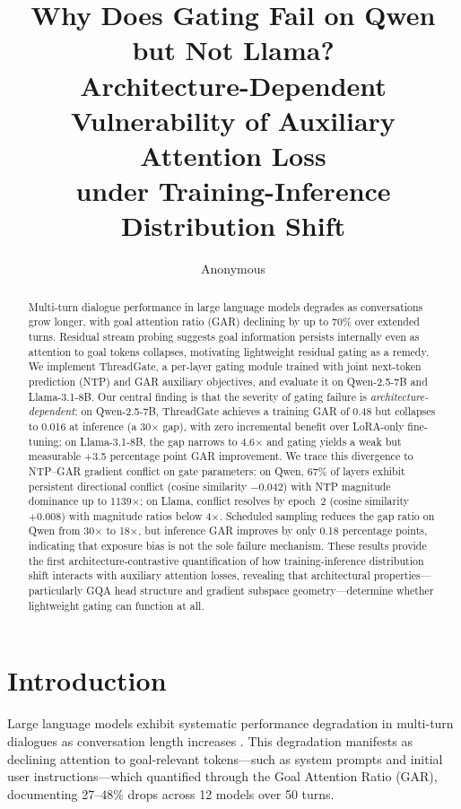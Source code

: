 \documentclass[11pt,a4paper]{article}
\title{Why Does Gating Fail on Qwen but Not Llama?\\Architecture-Dependent Vulnerability of Auxiliary Attention Loss\\under Training-Inference Distribution Shift}
\author{Anonymous}
\date{}
\begin{document}
\maketitle

\begin{abstract}
Multi-turn dialogue performance in large language models degrades as conversations grow longer, with goal attention ratio (GAR) declining by up to 70\% over extended turns.
Residual stream probing suggests goal information persists internally even as attention to goal tokens collapses, motivating lightweight residual gating as a remedy.
We implement ThreadGate, a per-layer gating module trained with joint next-token prediction (NTP) and GAR auxiliary objectives, and evaluate it on Qwen-2.5-7B and Llama-3.1-8B.
Our central finding is that the severity of gating failure is \emph{architecture-dependent}: on Qwen-2.5-7B, ThreadGate achieves a training GAR of 0.48 but collapses to 0.016 at inference (a 30$\times$ gap), with zero incremental benefit over LoRA-only fine-tuning; on Llama-3.1-8B, the gap narrows to 4.6$\times$ and gating yields a weak but measurable +3.5 percentage point GAR improvement.
We trace this divergence to NTP--GAR gradient conflict on gate parameters: on Qwen, 67\% of layers exhibit persistent directional conflict (cosine similarity $-0.042$) with NTP magnitude dominance up to 1139$\times$; on Llama, conflict resolves by epoch~2 (cosine similarity $+0.008$) with magnitude ratios below 4$\times$.
Scheduled sampling reduces the gap ratio on Qwen from 30$\times$ to 18$\times$, but inference GAR improves by only 0.18 percentage points, indicating that exposure bias is not the sole failure mechanism.
These results provide the first architecture-contrastive quantification of how training-inference distribution shift interacts with auxiliary attention losses, revealing that architectural properties---particularly GQA head structure and gradient subspace geometry---determine whether lightweight gating can function at all.
\end{abstract}

\section{Introduction}
\label{sec:intro}

Large language models exhibit systematic performance degradation in multi-turn dialogues as conversation length increases \citep{liu2024lost,dongre2026multiturn}.
This degradation manifests as declining attention to goal-relevant tokens---such as system prompts and initial user instructions---which \citet{dongre2026multiturn} quantified through the Goal Attention Ratio (GAR), documenting 27--48\% drops across 12 models over 50 turns.
\end{document}
